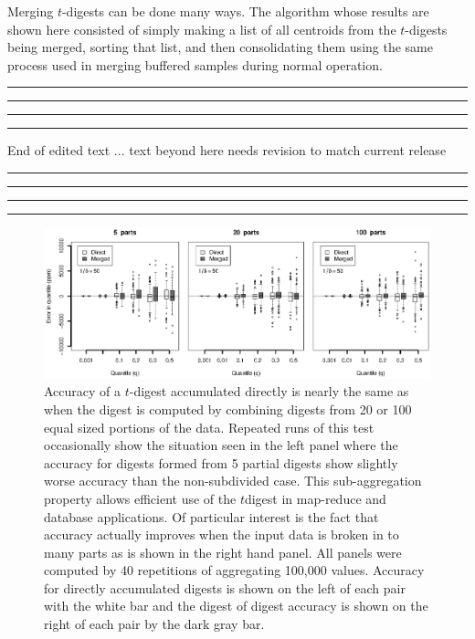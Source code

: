 \documentclass[11pt]{amsart}
\begin{document}
Merging $t$-digests can be done many ways.  The algorithm whose results are shown here consisted of simply making a list of all centroids from the $t$-digests being merged, sorting that list, and then consolidating them using the same process used in merging buffered samples during normal operation.

\vspace{10mm}
\hrule
\vspace{0.4mm}
\hrule
\vspace{.6mm}
\hrule
\vspace{1mm}
\hrule
End of edited text ... text beyond here needs revision to match current release
\hrule
\vspace{1mm}
\hrule
\vspace{0.6mm}
\hrule
\vspace{0.4mm}
\hrule
\vspace{10mm}

\begin{figure}[htb] %
   \centering
   \includegraphics[width=6in]{merge.eps} 
   \caption{Accuracy of a $t$-digest accumulated directly is nearly the same as when the digest is computed by combining digests from 20 or 100 equal sized portions of the data.  Repeated runs of this test occasionally show the situation seen in the left panel where the accuracy for digests formed from 5 partial digests show slightly worse accuracy than the non-subdivided case.  This sub-aggregation property allows efficient use of the $t$digest in map-reduce and database applications.  Of particular interest is the fact that accuracy actually improves when the input data is broken in to many parts as is shown in the right hand panel.  All panels were computed by 40 repetitions of aggregating 100,000 values. Accuracy for directly accumulated digests is shown on the left of each pair with the white bar and the digest of digest accuracy is shown on the right of each pair by the dark gray bar.}
   \label{fig:merge}
\end{figure}
\end{document}
